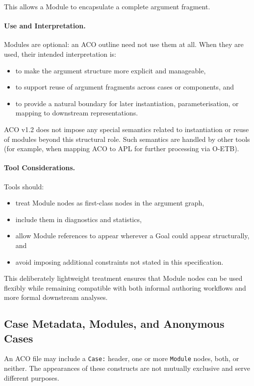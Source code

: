 \documentclass[11pt]{article}
\begin{document}
This allows a Module to encapsulate a complete argument fragment.

\paragraph{Use and Interpretation.}
Modules are optional: an ACO outline need not use them at all. When they are used,
their intended interpretation is:
\begin{itemize}[leftmargin=2em]
  \item to make the argument structure more explicit and manageable,
  \item to support reuse of argument fragments across cases or components, and
  \item to provide a natural boundary for later instantiation, parameterisation,
        or mapping to downstream representations.
\end{itemize}

ACO v1.2 does not impose any special semantics related to instantiation or reuse of modules
beyond this structural role. Such semantics are handled by other tools (for example,
when mapping ACO to APL for further processing via O-ETB).

\paragraph{Tool Considerations.}
Tools should:
\begin{itemize}[leftmargin=2em]
  \item treat Module nodes as first-class nodes in the argument graph,
  \item include them in diagnostics and statistics,
  \item allow Module references to appear wherever a Goal could appear structurally, and
  \item avoid imposing additional constraints not stated in this specification.
\end{itemize}

This deliberately lightweight treatment ensures that Module nodes can be used
flexibly while remaining compatible with both informal authoring workflows and
more formal downstream analyses.

\subsection{Case Metadata, Modules, and Anonymous Cases}

An ACO file may include a \texttt{Case:} header, one or more \texttt{Module} nodes, both, or neither.
The appearances of these constructs are not mutually exclusive and serve different purposes.
\end{document}
